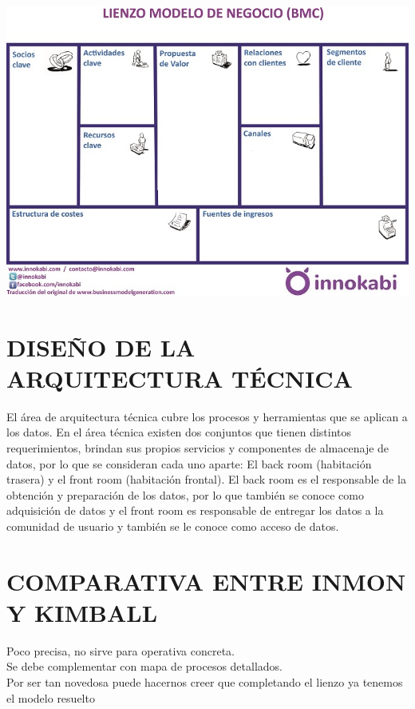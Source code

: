 \begin{center}
\includegraphics[width=15cm]{./Imagenes/imagen4}
\end{center}

\section{DISEÑO DE LA ARQUITECTURA TÉCNICA}
\item{El área de arquitectura técnica cubre los procesos y herramientas que se aplican a los datos. En el área técnica existen dos conjuntos que tienen distintos requerimientos, brindan sus propios servicios y componentes de almacenaje de datos, por lo que se consideran cada uno aparte: El back room (habitación trasera) y el front room (habitación frontal). El back room es el responsable de la obtención y preparación de los datos, por lo que también se conoce como adquisición de datos y el front room es responsable de entregar los datos a la comunidad de usuario y también se le conoce como acceso de datos.
}

\section{COMPARATIVA ENTRE INMON Y KIMBALL}
\item{
Poco precisa, no sirve para operativa concreta.\\
Se debe complementar con mapa de procesos detallados.\\
Por ser tan novedosa puede hacernos creer que completando el lienzo ya tenemos el modelo resuelto}

